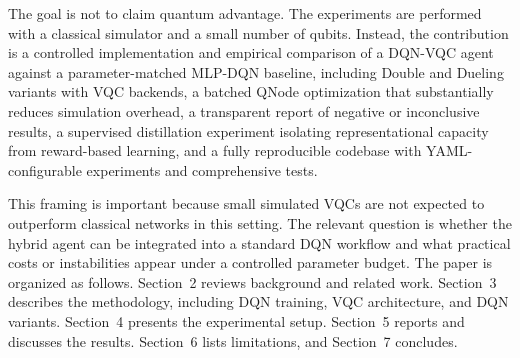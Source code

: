 The goal is not to claim quantum advantage. The experiments are performed with
a classical simulator and a small number of qubits. Instead, the contribution
is a controlled implementation and empirical comparison of a DQN-VQC agent
against a parameter-matched MLP-DQN baseline, including Double and Dueling
variants with VQC backends, a batched QNode optimization that substantially
reduces simulation overhead, a transparent report of negative or inconclusive
results, a supervised distillation experiment isolating representational
capacity from reward-based learning, and a fully reproducible codebase with
YAML-configurable experiments and comprehensive tests.

This framing is important because small simulated VQCs are not expected to
outperform classical networks in this setting. The relevant question is whether
the hybrid agent can be integrated into a standard DQN workflow and what
practical costs or instabilities appear under a controlled parameter budget.
The paper is organized as follows. Section~2 reviews background and related
work. Section~3 describes the methodology, including DQN training, VQC
architecture, and DQN variants. Section~4 presents the experimental setup.
Section~5 reports and discusses the results. Section~6 lists limitations,
and Section~7 concludes.
